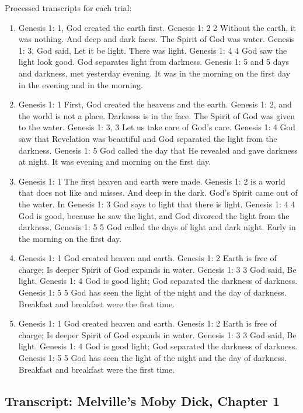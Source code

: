 \documentclass{article}
\begin{document}
Processed transcripts for each trial:

\begin{enumerate}
\item 
Genesis 1: 1, God created the earth first.
Genesis 1: 2 2 Without the earth, it was nothing. And deep and dark faces. The Spirit of God was water.
Genesis 1: 3, God said, Let it be light. There was light.
Genesis 1: 4 4 God saw the light look good. God separates light from darkness.
Genesis 1: 5 and 5 days and darkness, met yesterday evening. It was in the morning on the first day in the evening and in the morning.


\item 
Genesis 1: 1 First, God created the heavens and the earth.
Genesis 1: 2, and the world is not a place. Darkness is in the face. The Spirit of God was given to the water.
Genesis 1: 3, 3 Let us take care of God's care.
Genesis 1: 4 God saw that Revelation was beautiful and God separated the light from the darkness.
Genesis 1: 5 God called the day that He revealed and gave darkness at night. It was evening and morning on the first day.


\item 
Genesis 1: 1 The first heaven and earth were made.
Genesis 1: 2 is a world that does not like and misses. And deep in the dark. God's Spirit came out of the water.
In Genesis 1: 3 God says to light that there is light.
Genesis 1: 4 4 God is good, because he saw the light, and God divorced the light from the darkness.
Genesis 1: 5 5 God called the days of light and dark night. Early in the morning on the first day.


\item 
Genesis 1: 1 God created heaven and earth.
Genesis 1: 2 Earth is free of charge; Is deeper Spirit of God expands in water.
Genesis 1: 3 3 God said, Be light.
Genesis 1: 4 God is good light; God separated the darkness of darkness.
Genesis 1: 5 5 God has seen the light of the night and the day of darkness. Breakfast and breakfast were the first time.


\item 
Genesis 1: 1 God created heaven and earth.
Genesis 1: 2 Earth is free of charge; Is deeper Spirit of God expands in water.
Genesis 1: 3 3 God said, Be light.
Genesis 1: 4 God is good light; God separated the darkness of darkness.
Genesis 1: 5 5 God has seen the light of the night and the day of darkness. Breakfast and breakfast were the first time.

\end{enumerate}\subsection{Transcript: Melville’s Moby Dick, Chapter 1}
\end{document}
